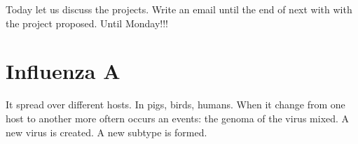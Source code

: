 \documentclass[../main/main.tex]{subfiles}
\begin{document}


Today let us discuss the projects.
Write an email until the end of next with with the project proposed. Until Monday!!!

\section{Influenza A}
It spread over different hosts. In pigs, birds, humans. When it change from one host to another more oftern occurs an events: the genoma of the virus mixed. A new virus is created. A new subtype is formed. 
\end{document}
